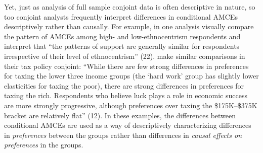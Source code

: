 \documentclass[a4paper,12pt]{article}\usepackage[]{graphicx}\usepackage[]{color}
\begin{document}
Yet, just as analysis of full sample conjoint data is often descriptive in nature, so too conjoint analysts frequently interpret differences in conditional AMCEs descriptively rather than causally. For example, in one analysis \citet{HainmuellerHopkinsYamamoto2014} visually compare the pattern of AMCEs among high- and low-ethnocentrism respondents and interpret that ``the patterns of support are generally similar for respondents irrespective of their level of ethnocentrism'' (22). \citet{BallardRosaMartinScheve2016} make similar comparisons in their tax policy conjoint: ``While there are few strong differences in preferences for taxing the lower three income groups (the `hard work' group has slightly lower elasticities for taxing the poor), there are strong differences in preferences for taxing the rich. Respondents who believe luck plays a role in economic success are more strongly progressive, although preferences over taxing the \$175K--\$375K bracket are relatively flat'' (12). In these examples, the differences between conditional AMCEs are used as a way of descriptively characterizing differences in \textit{preferences} between the groups rather than differences in \textit{causal effects on preferences} in the groups.
\end{document}
